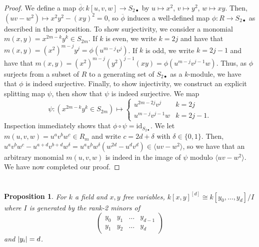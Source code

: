 \documentclass[english,letter,doublesided]{article}
\DeclarePairedDelimiter\abs{\lvert}{\rvert}%
\newcommand{\ldt}{\bullet}
\newcommand{\prob}[1]{\setcounter{section}{#1-1}\section{}}
\newtheorem*{prop*}{Proposition}
\theoremstyle{remark}
\theoremstyle{definition}
\newcommand{\idl}[1]{\langle #1 \rangle}
\newcommand{\id}{\mathrm{id} }
\newcommand{\bph}{\overline{\phi}}
\begin{document}
	\begin{proof}
		We define a map $\bph: k[u,v,w]\to S_{2\ldt}$ by $u\mapsto x^2$, $v\mapsto y^2$, $w\mapsto xy$. Then, $(uv-w^2)\mapsto x^2y^2-(xy)^2=0$, so $\bph$ induces a well-defined map $\phi:R\to S_{2\ldt}$ as described in the proposition. To show surjectivity, we consider a monomial $m(x,y)=x^{2m-k}y^k\in S_{2m}$. If $k$ is even, we write $k=2j$ and have that $m(x,y)=(x^2)^{m-j}y^j=\phi(u^{m-j}v^{j})$. If $k$ is odd, we write $k=2j-1$ and have that $m(x,y)=(x^2)^{m-j}(y^2)^{j-1}(xy)=\phi(u^{m-j}v^{j-1}w)$. Thus, as $\phi$ surjects from a subset of $R$ to a generating set of $S_{2\ldt}$ as a $k$-module, we have that $\phi$ is indeed surjective. Finally, to show injectivity, we construct an explicit splitting map $\psi$, then show that $\psi$ is indeed surjective. We map \begin{equation*}\psi: \left(x^{2m-k}y^k\in S_{2m}\right)\mapsto \begin{cases}
		u^{2m-2j}v^j&k=2j\\
		u^{m-j}v^{j-1}w&k=2j-1.
		\end{cases}\end{equation*} Inspection immediately shows that $\phi\circ \psi=\id_{S_{2\ldt}}$. We let $m(u,v,w)=u^av^bw^c\in R_m$ and write $c=2d+\delta$ with $\delta\in \{0,1\}$. Then, $u^av^bw^c-u^{a+d}v^{b+d}w^\delta=u^av^bw^\delta(w^{2d}-u^dv^d)\in \idl{uv-w^2}$, so we have that an arbitrary monomial $m(u,v,w)$ is indeed in the image of $\psi$ modulo $\idl{uv-w^2}$. We have now completed our proof.
	\end{proof}
	\prob{6}
	\begin{prop*} For $k$ a field and $x,y$ free variables,
	$k[x,y]^{[d]}\cong k[y_0,\dots,y_d]/I$ where $I$ is generated by the rank-2 minors of $$\begin{pmatrix}
	y_0&y_1&\dots &y_{d-1}\\
	y_1&y_2&\dots &y_d
	\end{pmatrix}$$ and $\abs{y_i}=d$.
	\end{prop*}
\end{document}

